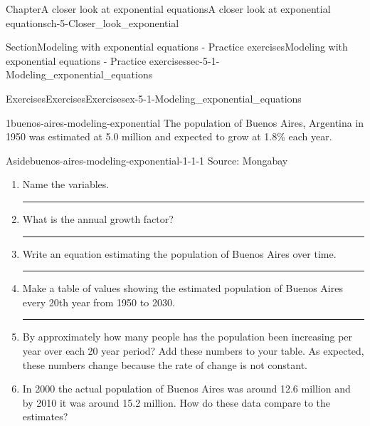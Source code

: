\documentclass[twoside,11pt,]{book}
\newlength{\workspacestrutwidth}
\numberwithin{equation}{section}
\begin{document}
\begin{chapterptx}{Chapter}{A closer look at exponential equations}{}{A closer look at exponential equations}{}{}{ch-5-Closer_look_exponential}
\renewcommand*{\chaptername}{Chapter}
%
%
\typeout{************************************************}
\typeout{************************************************}
%
\begin{sectionptx}{Section}{Modeling with exponential equations - Practice exercises}{}{Modeling with exponential equations - Practice exercises}{}{}{sec-5-1-Modeling_exponential_equations}
%
%
\typeout{************************************************}
\typeout{************************************************}
%
\begin{exercises-subsection-numberless}{Exercises}{Exercises}{}{Exercises}{}{}{ex-5-1-Modeling_exponential_equations}
\begin{divisionexercise}{1}{}{}{buenos-aires-modeling-exponential}%
The population of Buenos Aires, Argentina in 1950 was estimated at 5.0 million and expected to grow at 1.8\% each year. \begin{aside}{Aside}{}{buenos-aires-modeling-exponential-1-1-1}%
Source: Mongabay%
\end{aside}
%
\begin{enumerate}[label=(\alph*),ref=\alph*]%
\item{}Name the variables.%
\par\rule{\workspacestrutwidth}{0.75in}%
\item{}What is the annual growth factor?%
\par\rule{\workspacestrutwidth}{0.75in}%
\item{}Write an equation estimating the population of Buenos Aires over time.%
\par\rule{\workspacestrutwidth}{0.75in}%
\item{}Make a table of values showing the estimated population of Buenos Aires every 20th year from 1950 to 2030.%
\par\rule{\workspacestrutwidth}{2in}%
\item{}By approximately how many people has the population been increasing per year over each 20 year period? Add these numbers to your table. As expected, these numbers change because the rate of change is not constant.%
\item{}In 2000 the actual population of Buenos Aires was around 12.6 million and by 2010 it was around 15.2 million. How do these data compare to the estimates?%

\end{enumerate}
\end{divisionexercise}
\end{exercises-subsection-numberless}
\end{sectionptx}
\end{chapterptx}
\end{document}
